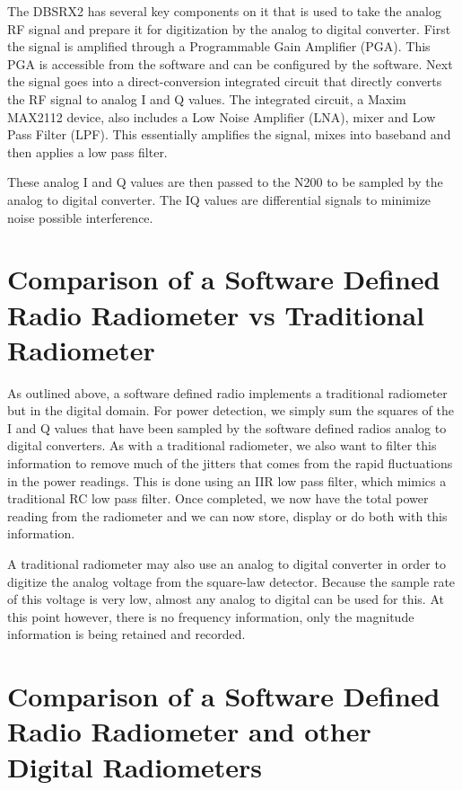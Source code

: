The DBSRX2 has several key components on it that is used to take the analog RF signal and prepare it for digitization by the analog to digital converter.  First the signal is amplified through a Programmable Gain Amplifier (PGA).  This PGA is accessible from the software and can be configured by the software.  Next the signal goes into a direct-conversion integrated circuit that directly converts the RF signal to analog I and Q values.  The integrated circuit, a Maxim MAX2112 device, also includes a Low Noise Amplifier (LNA), mixer and Low Pass Filter (LPF).  This essentially amplifies the signal, mixes into baseband and then applies a low pass filter.  

These analog I and Q values are then passed to the N200 to be sampled by the analog to digital converter.  The IQ values are differential signals to minimize noise possible interference.

\section{Comparison of a Software Defined Radio Radiometer vs Traditional Radiometer}

As outlined above, a software defined radio implements a traditional radiometer but in the digital domain.  For power detection, we simply sum the squares of the I and Q values that have been sampled by the software defined radios analog to digital converters.  As with a traditional radiometer, we also want to filter this information to remove much of the jitters that comes from the rapid fluctuations in the power readings.  This is done using an IIR low pass filter, which mimics a traditional RC low pass filter.  Once completed, we now have the total power reading from the radiometer and we can now store, display or do both with this information.  

A traditional radiometer may also use an analog to digital converter in order to digitize the analog voltage from the square-law detector.  Because the sample rate of this voltage is very low, almost any analog to digital can be used for this.  At this point however, there is no frequency information, only the magnitude information is being retained and recorded.

\section{Comparison of a Software Defined Radio Radiometer and other Digital Radiometers}

